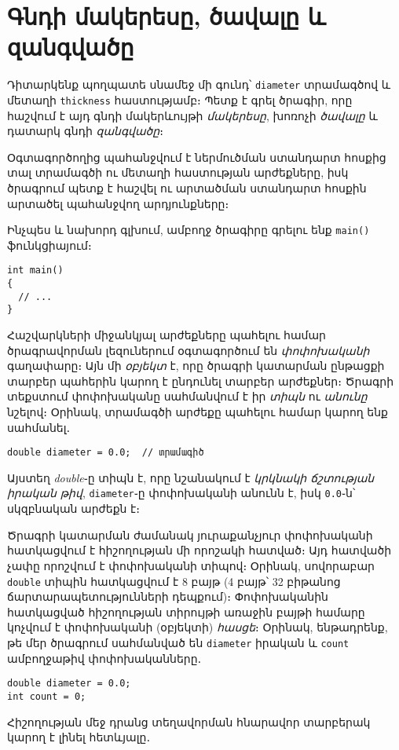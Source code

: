 \chapter{Գնդի մակերեսը, ծավալը և զանգվածը}

Դիտարկենք պողպատե սնամեջ մի գունդ՝ \texttt{diameter} տրամագծով 
և մետաղի \texttt{thickness} հաստությամբ։ Պետք է գրել ծրագիր, որը 
հաշվում է այդ գնդի մակերևույթի \emph{մակերեսը}, խոռոչի \emph{ծավալը} 
և դատարկ գնդի \emph{զանգվածը}։

Օգտագործողից պահանջվում է ներմուծման ստանդարտ հոսքից տալ տրամագծի 
ու մետաղի հաստության արժեքները, իսկ ծրագրում պետք է հաշվել ու արտածման 
ստանդարտ հոսքին արտածել պահանջվող արդյունքները։

Ինչպես և նախորդ գլխում, ամբողջ ծրագիրը գրելու ենք \texttt{main()} 
ֆունկցիայում։

\begin{Verbatim}
int main()
{
  // ... 
}
\end{Verbatim}

Հաշվարկների միջանկյալ արժեքները պահելու համար ծրագրավորման լեզուներում 
օգտագործում են \emph{փոփոխականի} գաղափարը։ Այն մի \emph{օբյեկտ} է, որը 
ծրագրի կատարման ընթացքի տարբեր պահերին կարող է ընդունել տարբեր արժեքներ։ 
Ծրագրի տեքստում փոփոխականը սահմանվում է իր \emph{տիպն} ու \emph{անունը} 
նշելով։ Օրինակ, տրամագծի արժեքը պահելու համար կարող ենք սահմանել․

\begin{Verbatim}
double diameter = 0.0;  // տրամագիծ
\end{Verbatim}

Այստեղ \emph{double}֊ը տիպն է, որը նշանակում է \emph{կրկնակի ճշտության 
իրական թիվ}, \texttt{diameter}֊ը փոփոխականի անունն է, իսկ \texttt{0.0}֊ն՝ 
սկզբնական արժեքն է։ 

Ծրագրի կատարման ժամանակ յուրաքանչյուր փոփոխականի հատկացվում է հիշողության 
մի որոշակի հատված։ Այդ հատվածի չափը որոշվում է փոփոխականի տիպով։ Օրինակ, 
սովորաբար \texttt{double} տիպին հատկացվում է 8 բայթ (4 բայթ՝ 32 բիթանոց 
ճարտարապետությունների դեպքում)։ Փոփոխականին հատկացված հիշողության տիրույթի 
առաջին բայթի համարը կոչվում է փոփոխականի (օբյեկտի) \emph{հասցե}։ Օրինակ, 
ենթադրենք, թե մեր ծրագրում սահմանված են \texttt{diameter} իրական և 
\texttt{count} ամբողջաթիվ փոփոխականները․

\begin{Verbatim}
double diameter = 0.0;
int count = 0;
\end{Verbatim}

Հիշողության մեջ դրանց տեղավորման հնարավոր տարբերակ կարող է լինել հետևյալը․

